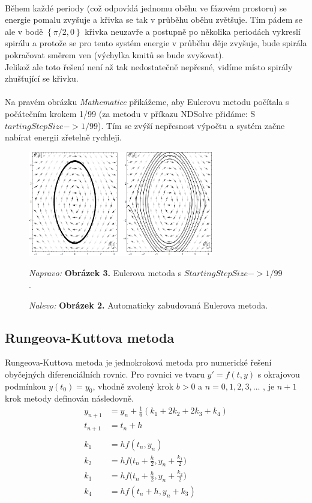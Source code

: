 \documentclass[reqno, a4paper]{amsart}
\begin{document}
				\\
				Během každé periody (což odpovídá jednomu oběhu ve fázovém prostoru) se energie pomalu zvyšuje a křivka se tak v průběhu oběhu zvětšuje. Tím pádem se ale v bodě $\left\lbrace \pi/2,0\right\rbrace $ křivka neuzavře a postupně po několika periodách vykreslí spirálu a protože se pro tento systém energie v průběhu děje zvyšuje, bude spirála pokračovat směrem ven (výchylka kmitů se bude zvyšovat). 
				\\
				Jelikož ale toto řešení není až tak nedostatečně nepřesné, vidíme místo spirály zhušťující se křivku.
				\\
				\\
				Na pravém obrázku \textit{Mathematice} přikážeme, aby Eulerovu metodu počítala s počátečním krokem 1/99 (za metodu v příkazu NDSolve přidáme: S$ tartingStepSize -> 1/99 $). Tím se zvýší nepřesnost výpočtu a systém začne nabírat energii zřetelně rychleji.
				\begin{figure}[h]
					\centering
					\includegraphics[width=0.72\textwidth]{pole2}
					\caption*{\textit{Nalevo:} \textbf{Obrázek 2.} Automaticky zabudovaná Eulerova metoda.}  \textit{Napravo:} \textbf{Obrázek 3.} Eulerova metoda s $StartingStepSize -> 1/99$.
				\end{figure}
				\clearpage
				\subsection{Rungeova-Kuttova metoda}
				\label{sec:Rungeova-Kuttova metoda}
				Rungeova-Kuttova metoda je jednokroková metoda pro numerické řešení obyčejných diferenciálních rovnic. Pro rovnici ve tvaru \( y'= f(t,y)\) s okrajovou podmínkou \(y(t_0)=y_0 \), vhodně zvolený krok \(b>0\) a \(n = 0, 1, 2, 3, ...\) , je $n+1$ krok metody definován následovně.
				\vspace{0.5cm}
				\begin{align}
					\label{eq:20}
					y_{n+1} &= y_n + \frac{1}{6} (k_1 + 2k_2 +2k_3 +k_4) \\
					t_{n+1} &= t_n +h \\ \\
					k_1 &= h f(t_n,y_n) \\
					k_2 &= h f\Big(t_n + \frac{h}{2},y_n + \frac{k_1}{2}\Big) \\
					k_3 &= h f\Big(t_n + \frac{h}{2},y_n + \frac{k_2}{2}\Big) \\
					k_4 &= h f(t_n + h ,y_n + k_3) 
				\end{align}
				\vspace{0.5cm}
\end{document}
